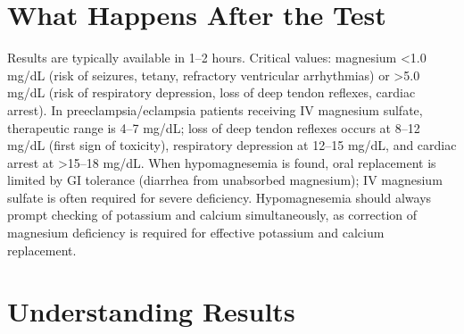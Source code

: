\section*{What Happens After the Test}
Results are typically available in 1--2 hours. Critical values: magnesium <1.0 mg/dL (risk of seizures, tetany, refractory ventricular arrhythmias) or >5.0 mg/dL (risk of respiratory depression, loss of deep tendon reflexes, cardiac arrest). In preeclampsia/eclampsia patients receiving IV magnesium sulfate, therapeutic range is 4--7 mg/dL; loss of deep tendon reflexes occurs at 8--12 mg/dL (first sign of toxicity), respiratory depression at 12--15 mg/dL, and cardiac arrest at >15--18 mg/dL. When hypomagnesemia is found, oral replacement is limited by GI tolerance (diarrhea from unabsorbed magnesium); IV magnesium sulfate is often required for severe deficiency. Hypomagnesemia should always prompt checking of potassium and calcium simultaneously, as correction of magnesium deficiency is required for effective potassium and calcium replacement.

\section*{Understanding Results}

